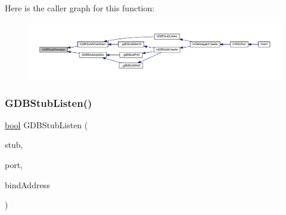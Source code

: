 Here is the caller graph for this function\+:
\nopagebreak
\begin{figure}[H]
\begin{center}
\leavevmode
\includegraphics[width=350pt]{gdb-stub_8c_a28c1b7ad1cc9e5dbf3a8204d45ee2813_icgraph}
\end{center}
\end{figure}
\mbox{\label{gdb-stub_8c_a0ccf43b868dd63e4eb34e327a7b16816}} 
\subsubsection{\texorpdfstring{G\+D\+B\+Stub\+Listen()}{GDBStubListen()}}
{\footnotesize\ttfamily \mbox{\hyperlink{libretro_8h_a4a26dcae73fb7e1528214a068aca317e}{bool}} G\+D\+B\+Stub\+Listen (\begin{DoxyParamCaption}\item[{struct G\+D\+B\+Stub $\ast$}]{stub,  }\item[{\mbox{\hyperlink{ioapi_8h_a787fa3cf048117ba7123753c1e74fcd6}{int}}}]{port,  }\item[{const struct Address $\ast$}]{bind\+Address }\end{DoxyParamCaption})}

